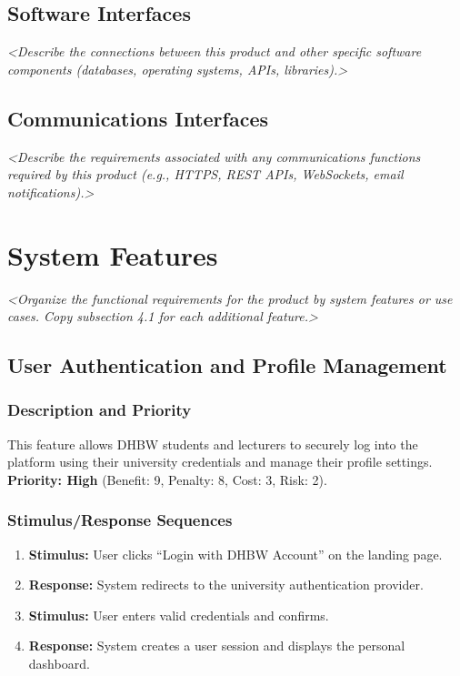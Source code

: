 \documentclass[11pt, a4paper]{article}
\newcommand{\guidance}[1]{\textit{\color{darkgray}<#1>}}
\begin{document}
\subsection{Software Interfaces}
\guidance{Describe the connections between this product and other specific software components (databases, operating systems, APIs, libraries).}

\subsection{Communications Interfaces}
\guidance{Describe the requirements associated with any communications functions required by this product (e.g., HTTPS, REST APIs, WebSockets, email notifications).}

\section{System Features}
\guidance{Organize the functional requirements for the product by system features or use cases. Copy subsection 4.1 for each additional feature.}

\subsection{User Authentication and Profile Management}
\subsubsection{Description and Priority}
This feature allows DHBW students and lecturers to securely log into the platform using their university credentials and manage their profile settings. \textbf{Priority: High} (Benefit: 9, Penalty: 8, Cost: 3, Risk: 2).

\subsubsection{Stimulus/Response Sequences}
\begin{enumerate}
    \item \textbf{Stimulus:} User clicks ``Login with DHBW Account'' on the landing page.
    \item \textbf{Response:} System redirects to the university authentication provider.
    \item \textbf{Stimulus:} User enters valid credentials and confirms.
    \item \textbf{Response:} System creates a user session and displays the personal dashboard.
\end{enumerate}
\end{document}
